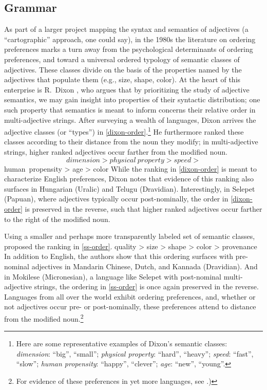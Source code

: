 \documentclass{pnastwo}
\begin{document}
\begin{article}
\subsection{Grammar}
As part of a larger project mapping the syntax and semantics of adjectives (a ``cartographic'' approach, one could say), in the 1980s the literature on ordering preferences marks a turn away from the psychological determinants of ordering preferences, and toward a universal ordered typology of semantic classes of adjectives. These classes divide on the basis of the properties named by the adjectives that populate them (e.g., size, shape, color). At the heart of this enterprise is R.~Dixon \cite{dixon1982}, who argues that by prioritizing the study of adjective semantics, we may gain insight into properties of their syntactic distribution; one such property that semantics is meant to inform concerns their relative order in multi-adjective strings. After surveying a wealth of languages, Dixon arrives the adjective classes (or ``types'') in \ref{dixon-order}.\footnote{Here are some representative examples of Dixon's semantic classes:\\ \textit{dimension}: ``big'', ``small''; \textit{physical property}: ``hard'', ``heavy''; \textit{speed}: ``fast'', ``slow''; \textit{human propensity}: ``happy'', ``clever''; \textit{age}: ``new'', ``young''.} He furthermore ranked these classes according to their distance from the noun they modify; in multi-adjective strings, higher ranked adjectives occur farther from the modified noun.
\[
dimension > physical\ property > speed > 
\]
\be human\ propensity > age > color\label{dixon-order}\ee
While the ranking in \ref{dixon-order} is meant to characterize English preferences, Dixon notes that evidence of this ranking also surfaces in Hungarian (Uralic) and Telugu (Dravidian). Interestingly, in Selepet (Papuan), where adjectives typically occur post-nominally, the order in \ref{dixon-order} is preserved in the reverse, such that higher ranked adjectives occur farther to the right of the modified noun. 

Using a smaller and perhaps more transparently labeled set of semantic classes, \cite{sproatshih1991} proposed the ranking in \ref{ss-order}.
\be quality > size > shape > color > provenance\label{ss-order}\ee
In addition to English, the authors show that this ordering surfaces with pre-nominal adjectives in Mandarin Chinese, Dutch, and Kannada (Dravidian). And in Mokilese (Micronesian), a language like Selepet with post-nominal multi-adjective strings, the ordering in \ref{ss-order} is once again preserved in the reverse. Languages from all over the world exhibit ordering preferences, and, whether or not adjectives occur pre- or post-nominally, these preferences attend to distance from the modified noun.\footnote{For evidence of these preferences in yet more languages, see \cite{martin1969competence,hetzron1978,lapollahuang2004}.)}


\end{article}
\end{document}
